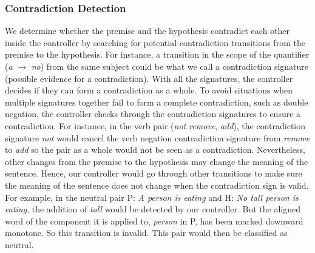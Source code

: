 \documentclass[11pt,a4paper]{article}
\begin{document}
\subsubsection{Contradiction Detection}
We determine whether the premise and the hypothesis contradict each other inside the controller by searching for potential contradiction transitions from the premise to the hypothesis. For instance, a transition in the scope of
the quantifier (\textit{a} $\longrightarrow$ \textit{no}) from the same subject could be what we call a contradiction signature
(possible evidence for a contradiction). With all the signatures, the controller decides if they can form a contradiction as a whole. To avoid situations when multiple signatures together fail to form a complete contradiction, such as double negation, the controller checks through the contradiction signatures to ensure a contradiction. For instance, in the verb pair (\textit{not remove}, {\textit{add}}), the contradiction signature \textit{not} would cancel the verb negation contradiction signature from \textit{remove} to \textit{add} so the pair as a whole would not be seen as a contradiction. Nevertheless, other changes from the premise to the hypothesis may change the meaning of the sentence. Hence, our controller would go through other transitions to make sure the meaning of the sentence does not change when the contradiction sign is valid. For example, in the neutral pair P: \textit{A person is eating} and H: \textit{No tall person is eating}, the addition of \textit{tall} would be detected by our controller.
But the aligned word of the component it is applied to, \textit{person} in P, 
has been marked downward monotone.  So this transition is invalid. This pair would then be classified as neutral.
\end{document}
